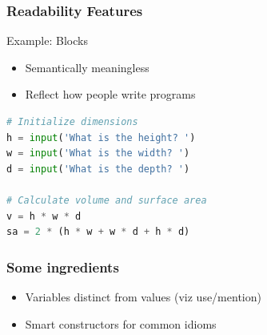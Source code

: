 \documentclass{beamer}
\begin{document}

\begin{frame}[fragile]

\frametitle{Readability Features}

Example: Blocks
\begin{itemize}
  \item Semantically meaningless
  \item Reflect how people write programs
\end{itemize}

\begin{lstlisting}[language=Python]
# Initialize dimensions
h = input('What is the height? ')
w = input('What is the width? ')
d = input('What is the depth? ')

# Calculate volume and surface area
v = h * w * d
sa = 2 * (h * w + w * d + h * d)
\end{lstlisting}
\end{frame}


\begin{frame}

\frametitle{Some ingredients}

\begin{itemize}
  \item<1-> Variables distinct from values (viz use/mention)
  \item<2-> Smart constructors for common idioms
\end{itemize}

\end{frame}

\end{document}
